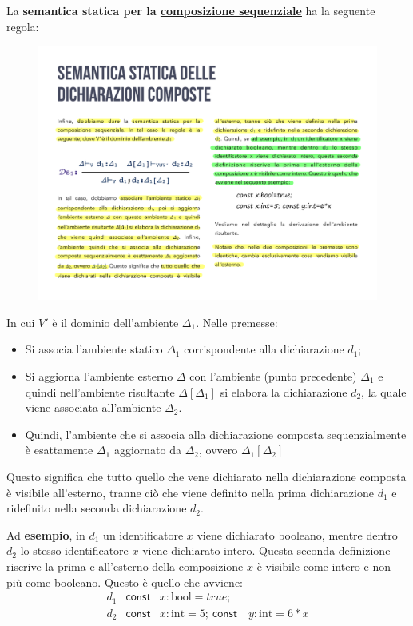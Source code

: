 \documentclass[a4paper]{article}
\begin{document}
	\noindent
	La \textbf{semantica statica per la \underline{composizione sequenziale}} ha la seguente regola:
	\begin{figure}[!htp]
		\centering
		\includegraphics[width=.6\textwidth]{img/semantica_statica_dichiarazioni-5.pdf}
	\end{figure}
	
	\noindent
	In cui $V'$ è il dominio dell'ambiente $\Delta_{1}$. Nelle premesse:
	\begin{itemize}
		\item Si associa l'ambiente statico $\Delta_{1}$ corrispondente alla dichiarazione $d_{1}$;
		
		\item Si aggiorna l'ambiente esterno $\Delta$ con l'ambiente (punto precedente) $\Delta_{1}$ e quindi nell'ambiente risultante $\Delta\left[\Delta_{1}\right]$ si elabora la dichiarazione $d_{2}$, la quale viene associata all'ambiente $\Delta_{2}$.
		
		\item Quindi, l'ambiente che si associa alla dichiarazione composta sequenzialmente è esattamente $\Delta_{1}$ aggiornato da $\Delta_{2}$, ovvero $\Delta_{1}\left[\Delta_{2}\right]$
	\end{itemize}
	Questo significa che tutto quello che vene dichiarato nella dichiarazione composta è visibile all'esterno, tranne ciò che viene definito nella prima dichiarazione $d_{1}$ e ridefinito nella seconda dichiarazione $d_{2}$.\newpage
	
	\noindent
	Ad \textcolor{Green4}{\textbf{esempio}}, in $d_{1}$ un identificatore $x$ viene dichiarato booleano, mentre dentro $d_{2}$ lo stesso identificatore $x$ viene dichiarato intero. Questa seconda definizione riscrive la prima e all'esterno della composizione $x$ è visibile come intero e non più come booleano. Questo è quello che avviene:
	\begin{equation*}
		\begin{array}{lll}
			d_{1} & \mathsf{const} & x:\mathrm{bool} = true; \\
			d_{2} & \mathsf{const} & x:\mathrm{int} = 5; \: \mathsf{const} \hspace{1em} y: \mathrm{int} = 6*x
		\end{array}
	\end{equation*}
	
\end{document}
